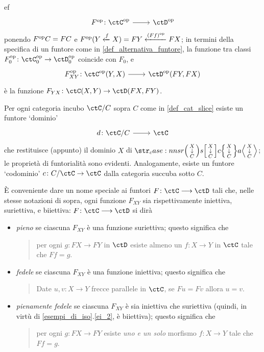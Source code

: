 \begin{examples}
\begin{enumtag}{ef}
  \[\dmFun{F^\op}{\ctC^\op}{\ctD^\op}\]
  ponendo \(F^{\text{op}} C=FC\) e \(F^{\text{op}}(Y \xleftarrow{f} X) = FY \xleftarrow{(Ff)^{\text{op}}} FX\); in termini della specifica di un funtore come in \ref{def_alternativa_funtore}, la funzione tra classi \(F^\op_0 \colon \ctC^\op_0\to\ctD^\op_0\) coincide con \(F_0\), e
  \[\dmFun{F_{XY}^\op}{\Hom{\ctC^\op}(Y,X)}{\Hom{\ctD^\op}(FY,FX)}\]
  è la funzione \(F_{YX} \colon \Hom{\ctC}(X,Y)\to \Hom{\ctD}(FX,FY)\).
  \item \label{exfun_7} Per ogni categoria incubo \(\ctC/C\) sopra \(C\) come in \ref{def_cat_slice} esiste un funtore `dominio'
  \[\dmFun{d}{\ctC/C}{\ctC}\]
  che restituisce (appunto) il dominio \(X\) di \(\var XC\); le proprietà di funtorialità sono evidenti. Analogamente, esiste un funtore `codominio' \(c \colon C/\ctC \to \ctC\) dalla categoria succuba sotto \(C\).
 \end{enumtag}
\end{examples}
\begin{definition}\label{classi_di_funtori}
 È conveniente dare un nome speciale ai funtori \(F \colon \ctC\fun\ctD\) tali che, nelle stesse notazioni di sopra, ogni funzione \(F_{XY}\) sia rispettivamente iniettiva, suriettiva, e biiettiva: \(F \colon \ctC\fun\ctD\) si dirà
 \begin{itemize}
  \item \emph{pieno} se ciascuna \(F_{XY}\) è una funzione suriettiva; questo significa che
        \begin{quote}
         per ogni \(g \colon FX\to FY\) in \(\ctD\) esiste almeno un \(f \colon X\to Y\) in \(\ctC\) tale che \(Ff=g\).
        \end{quote}
  \item \emph{fedele} se ciascuna \(F_{XY}\) è una funzione iniettiva; questo significa che
        \begin{quote}
         Date \(u,v \colon X\to Y\) frecce parallele in \(\ctC\), se \(Fu=Fv\) allora \(u=v\).
        \end{quote}
  \item \emph{pienamente fedele} se ciascuna \(F_{XY}\) è sia iniettiva che suriettiva (quindi, in virtù di \ref{esempi_di_iso}.\ref{ei_2}, è biiettiva); questo significa che
        \begin{quote}
         per ogni \(g \colon FX\to FY\) esiste \emph{uno e un solo} morfismo \(f \colon X\to Y\) tale che \(Ff=g\).
        \end{quote}
 \end{itemize}
\end{definition}
